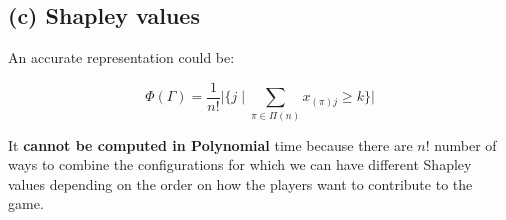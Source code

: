 \documentclass[12pt, a4paper]{article}
\begin{document}
\subsection{(c) Shapley values}
An accurate representation could be:

\begin{equation}
  \Phi(\Gamma) = \frac{1}{n!}\Biggr|\biggr\{j \mid \sum_{\pi \in \Pi(n)} x_{(\pi)j} \geq k \biggl\}\Biggl|
\end{equation}

It \textbf{cannot be computed in Polynomial} time because there are $n!$ number of ways to combine the configurations for which
we can have different Shapley values depending on the order on how the players want to contribute to the game.
\end{document}
